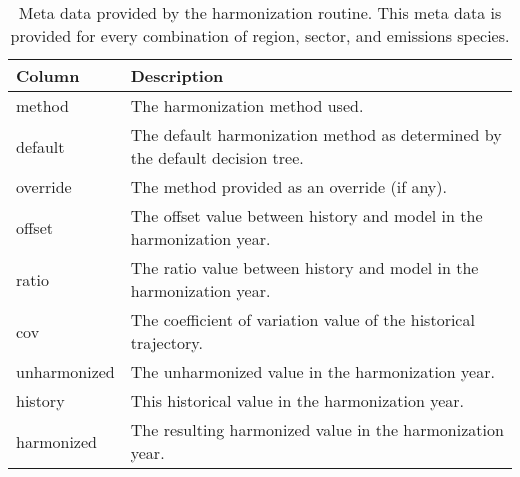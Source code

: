 \begin{table}[]
\centering
\caption{Meta data provided by the  harmonization routine. This meta data is provided for every combination of region, sector, and emissions species.}
\label{tab:metadata}
\begin{tabular}{|p{2cm}|p{8cm}|}
\hline
Column       & Description                                                                  \\
\hline
\hline
method       & The harmonization method used.                                               \\
\hline
default      & The default harmonization method as determined by the default decision tree. \\
\hline
override     & The method provided as an override (if any).                                 \\
\hline
offset       & The offset value between history and model in the harmonization year.        \\
\hline
ratio        & The ratio value between history and model in the harmonization year.         \\
\hline
cov          & The coefficient of variation value of the historical trajectory.                           \\
\hline
unharmonized & The unharmonized value in the harmonization year.                            \\
\hline
history      & This historical value in the harmonization year.                             \\
\hline
harmonized   & The resulting harmonized value in the harmonization year.\\
\hline
\end{tabular}
\end{table}
